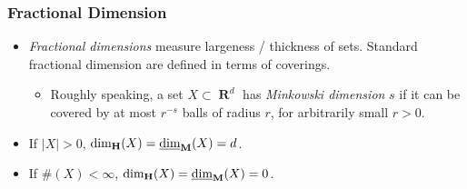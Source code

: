\documentclass[usenames,dvipsnames,handout]{beamer}
\DeclareMathOperator{\RR}{\textbf{R}}
\DeclareMathOperator{\hausdim}{\text{dim}_{\textbf{H}}}
\DeclareMathOperator{\lowminkdim}{\text{\underline{dim}}_{\textbf{M}}}
\begin{document}
\begin{frame}
  \frametitle{Fractional Dimension}

\begin{itemize}
    \item<1-> \emph{Fractional dimensions} measure largeness / thickness of sets. Standard fractional dimension are defined in terms of coverings.
    \begin{itemize}
        \item Roughly speaking, a set $X \subset \RR^d$ has \emph{Minkowski dimension} $s$ if it can be covered by at most $r^{-s}$ balls of radius $r$, for arbitrarily small $r > 0$.



    \end{itemize}
    \item If $|X| > 0$, $\hausdim(X) = \lowminkdim(X) = d$.

    \item If $\#(X) < \infty$, $\hausdim(X) = \lowminkdim(X) = 0$.
\end{itemize}

\end{frame}
\end{document}
